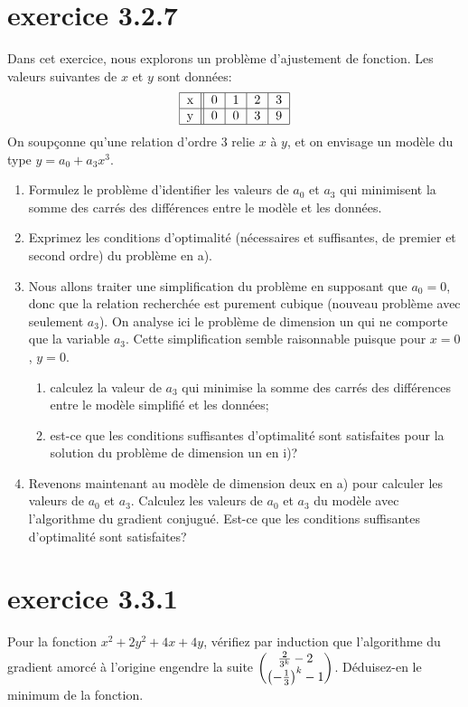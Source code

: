 \documentclass[12pt]{article}
\begin{document}
\section{exercice 3.2.7}
Dans cet exercice, nous explorons un problème d'ajuste\-ment de
fonction. Les valeurs suivantes de $x$ et $y$ sont données: 
$$\begin{tabular}{|l||l|l|l|l|}
\hline
x&0&1&2&3\\
\hline
y&0&0&3&9\\
\hline
\end{tabular}$$
On soupçonne qu'une relation d'ordre 3 relie $x$ à $y$, et on envisage
un modèle du type $y=a_0 + a_3x^3$.
  \begin{enumerate}
    \item Formulez le problème 
    d'identifier les valeurs de $a_0$ et $a_3$ qui minimisent la somme des carrés
    des différences entre le modèle et les données.
    \item Exprimez les conditions d'optimalité (nécessaires et
    suffisantes, de premier et second ordre) du problème en a).
    \item Nous allons traiter une simplification du problème en supposant que $a_0=0$, donc que la relation recherchée
    est purement cubique (nouveau problème avec seulement $a_3$). On analyse ici le problème de dimension un qui ne comporte que la variable $a_3$. Cette
    simplification semble raisonnable puisque pour $x=0$, $y=0$.
    \begin{enumerate}
    \item calculez la valeur de $a_3$ qui minimise la somme des carrés
    des différences entre le modèle simplifié et les données; 
    \item est-ce que les conditions suffisantes d'optimalité sont
    satisfaites pour la solution du problème de dimension un en i)?
    \end{enumerate}
    \item Revenons maintenant au modèle de dimension deux en a) pour calculer les valeurs de $a_0$ et $a_3$. 
    Calculez les valeurs de $a_0$ et $a_3$ du modèle
     avec l'algorithme du gradient conjugué.
Est-ce que les conditions suffisantes d'optimalité sont
    satisfaites?  
\end{enumerate}

\section{exercice 3.3.1}
Pour la fonction $x^2+2y^2+4x+4y$, vérifiez par induction que l'algorithme du gradient amorcé à l'origine engendre la suite $\begin{pmatrix}{2\over3^k}-2\\ \left(-{1\over3}\right)^k-1\end{pmatrix}$. Déduisez-en le minimum de la fonction.
\end{document}

